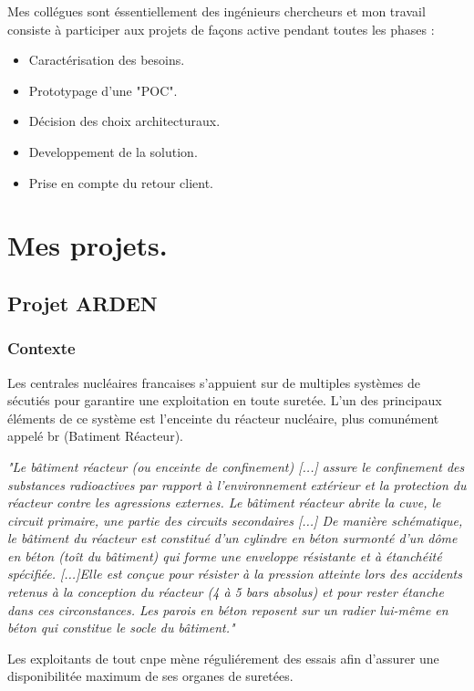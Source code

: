 Mes collégues sont éssentiellement des ingénieurs chercheurs et mon travail consiste à participer aux projets de façons active pendant toutes les phases : 
\begin{itemize}
\item Caractérisation des besoins.
\item Prototypage d'une "\gls{POC}".
\item Décision des choix architecturaux.
\item Developpement de la solution.
\item Prise en compte du retour client.
\end{itemize}

\chapter{Mes projets.}
\section{Projet ARDEN}
\subsection{Contexte}
Les centrales nucléaires francaises s'appuient sur de multiples systèmes de sécutiés pour garantire une exploitation en toute suretée. L'un des principaux éléments de ce système est l'enceinte du réacteur nucléaire, plus comunément appelé \acrshort{br} (Batiment Réacteur).

\textit{"Le bâtiment réacteur (ou enceinte de confinement) [...] assure le confinement des substances radioactives par rapport à l’environnement extérieur et la protection du réacteur contre les agressions externes.  
Le bâtiment réacteur abrite la cuve, le circuit primaire, une partie des circuits secondaires [...]
De manière schématique, le bâtiment du réacteur est constitué d’un cylindre en béton surmonté d’un dôme en béton (toît du bâtiment) qui forme une enveloppe résistante et à étanchéité spécifiée.
[...]Elle est conçue pour résister à la pression atteinte lors des accidents retenus à la conception du réacteur (4 à 5 bars absolus) et pour rester étanche dans ces circonstances. Les parois en béton reposent sur un radier lui-même en béton qui constitue le socle du bâtiment."}  \cite[IRSN]{IRSN_suretee}

Les exploitants de tout \acrshort{cnpe} mène réguliérement des essais afin d'assurer une disponibilitée maximum de ses organes de suretées. 

